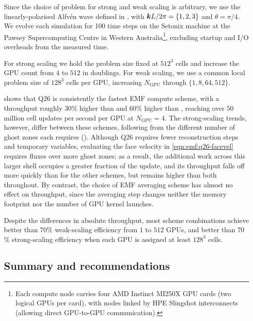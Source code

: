 Since the choice of problem for strong and weak scaling is arbitrary, we use the linearly-polarised Alfv\'en wave defined in , with $\bm{k} L / 2\pi = \{1, 2, 3\}$ and $\theta = \pi/4$. We evolve each simulation for 100 time steps on the Setonix machine at the Pawsey Supercomputing Centre in Western Australia\footnote{
    Each compute node carries four AMD Instinct MI250X GPU cards (two logical GPUs per card), with nodes linked by HPE Slingshot interconnects (allowing direct GPU-to-GPU communication).
}, excluding startup and I/O overheads from the measured time.

For strong scaling we hold the problem size fixed at $512^3$ cells and increase the GPU count from $4$ to $512$ in doublings. For weak scaling, we use a common local problem size of $128^3$ cells per GPU, increasing $N_\mathrm{GPU}$ through $\{1, 8, 64, 512\}$.

 shows that Q26 is consistently the fastest EMF compute scheme, with a throughput roughly $30\%$ higher than  and $60\%$ higher than , reaching over $50$ million cell updates per second per GPU at $N_\mathrm{GPU} = 4$. The strong-scaling trends, however, differ between these schemes, following from the different number of ghost zones each requires (). Although Q26 requires fewer reconstruction steps and temporary variables, evaluating the face velocity in \cref{eqn:emf:q26-facevel} requires fluxes over more ghost zones; as a result, the additional work across this larger shell occupies a greater fraction of the update, and its throughput falls off more quickly than for the other schemes, but remains higher than both throughout. By contrast, the choice of EMF averaging scheme has almost no effect on throughput, since the averaging step changes neither the memory footprint nor the number of GPU kernel launches.

Despite the differences in absolute throughput, most scheme combinations achieve better than $70$\% weak-scaling efficiency from $1$ to $512$ GPUs, and better than $70$\% strong-scaling efficiency when each GPU is assigned at least $128^3$ cells.

\subsection{Summary and recommendations}
\label{sec:scheme-comparison:recommendation}

